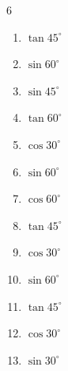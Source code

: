 \begin{multicols}{6}
\begin{enumerate}
  \item $\displaystyle \tan{45^\circ}$

        \phantom{$\displaystyle =1$}

  \item $\displaystyle \sin{60^\circ}$


  \item $\displaystyle \sin{45^\circ}$


  \item $\displaystyle \tan{60^\circ}$


  \item $\displaystyle \cos{30^\circ}$


  \item $\displaystyle \sin{60^\circ}$


  \item $\displaystyle \cos{60^\circ}$


  \item $\displaystyle \tan{45^\circ}$

        \phantom{$\displaystyle =1$}

\columnbreak %

  \item $\displaystyle \cos{30^\circ}$


  \item $\displaystyle \sin{60^\circ}$


  \item $\displaystyle \tan{45^\circ}$

        \phantom{$\displaystyle =1$}

  \item $\displaystyle \cos{30^\circ}$


  \item $\displaystyle \sin{30^\circ}$


\end{enumerate}
\end{multicols}
